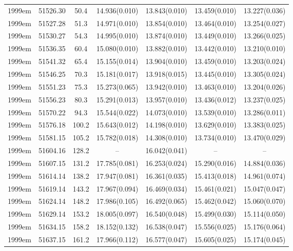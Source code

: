 \begin{table*}
\begin{tabular}{ccccccc}
1999em	  & 51526.30	 & 50.4	& 14.936(0.010)	 & 13.843(0.010)	 & 13.459(0.010)	 & 13.227(0.036) \\ 
1999em	  & 51527.28	 & 51.3	& 14.971(0.010)	 & 13.854(0.010)	 & 13.464(0.010)	 & 13.254(0.027) \\ 
1999em	  & 51530.27	 & 54.3	& 14.995(0.010)	 & 13.874(0.010)	 & 13.449(0.010)	 & 13.266(0.025) \\ 
1999em	  & 51536.35	 & 60.4	& 15.080(0.010)	 & 13.882(0.010)	 & 13.442(0.010)	 & 13.210(0.010) \\ 
1999em	  & 51541.32	 & 65.4	& 15.155(0.014)	 & 13.904(0.010)	 & 13.459(0.010)	 & 13.203(0.024) \\ 
1999em	  & 51546.25	 & 70.3	& 15.181(0.017)	 & 13.918(0.015)	 & 13.445(0.010)	 & 13.305(0.024) \\ 
1999em	  & 51551.23	 & 75.3	& 15.273(0.065)	 & 13.942(0.010)	 & 13.463(0.010)	 & 13.204(0.026) \\ 
1999em	  & 51556.23	 & 80.3	& 15.291(0.013)	 & 13.957(0.010)	 & 13.436(0.012)	 & 13.237(0.025) \\ 
1999em	  & 51570.22	 & 94.3	& 15.544(0.022)	 & 14.073(0.010)	 & 13.539(0.010)	 & 13.286(0.011) \\ 
1999em	  & 51576.18	 & 100.2	& 15.643(0.012)	 & 14.198(0.010)	 & 13.629(0.010)	 & 13.383(0.025) \\ 
1999em	  & 51581.15	 & 105.2	& 15.782(0.018)	 & 14.308(0.010)	 & 13.734(0.010)	 & 13.470(0.029) \\ 
1999em	  & 51604.16	 & 128.2	& --	 & 16.042(0.041)	 & --	 & -- \\ 
1999em	  & 51607.15	 & 131.2	& 17.785(0.081)	 & 16.253(0.024)	 & 15.290(0.016)	 & 14.884(0.036) \\ 
1999em	  & 51614.14	 & 138.2	& 17.947(0.081)	 & 16.361(0.035)	 & 15.413(0.018)	 & 14.961(0.074) \\ 
1999em	  & 51619.14	 & 143.2	& 17.967(0.094)	 & 16.469(0.034)	 & 15.461(0.021)	 & 15.047(0.047) \\ 
1999em	  & 51624.14	 & 148.2	& 17.986(0.105)	 & 16.492(0.065)	 & 15.462(0.042)	 & 15.060(0.070) \\ 
1999em	  & 51629.14	 & 153.2	& 18.005(0.097)	 & 16.540(0.048)	 & 15.499(0.030)	 & 15.114(0.050) \\ 
1999em	  & 51634.15	 & 158.2	& 18.152(0.132)	 & 16.538(0.047)	 & 15.556(0.025)	 & 15.176(0.064) \\ 
1999em	  & 51637.15	 & 161.2	& 17.966(0.112)	 & 16.577(0.047)	 & 15.605(0.025)	 & 15.174(0.045) \\ 

\end{tabular}
\end{table*}
